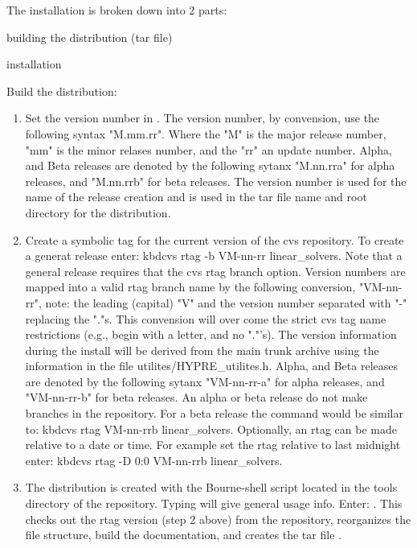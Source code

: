The installation is broken down into 2 parts: 
  \item building the distribution (tar file)
  \item installation

Build the \hypre{} distribution:

\begin{enumerate}

   \item Set the version number in .
   The version number, by convension, use the following syntax "M.mm.rr".
   Where the "M" is the major release number, "mm" is the minor
   relases number, and the "rr" an update number. Alpha, and Beta 
   releases are denoted by the following sytanx "M.nn.rra" for 
   alpha releases, and "M.nn.rrb" for beta releases. The version 
   number is used for the name of the release creation and is used
   in the tar file name and root directory for the distribution.

   \item Create a symbolic tag for the current version
   of the cvs repository. To create a generat release enter:
   kbd{cvs rtag -b VM-nn-rr linear_solvers}. Note that a
   general release requires that the cvs rtag branch option.
   Version numbers are mapped into a valid rtag branch name by the
   following conversion, "VM-nn-rr", note: the leading (capital)
   "V" and the version number separated with "-" replacing
   the "."s. This convension will over come the strict cvs
   tag name restrictions (e.g., begin with a letter, and no "."'s).
   The version information during the install will be derived
   from the main trunk archive using the information in the
   file utilites/HYPRE_utilites.h. Alpha, and Beta releases
   are denoted by the following sytanx "VM-nn-rr-a" for alpha
   releases, and "VM-nn-rr-b" for beta releases. An alpha or
   beta release do not make branches in the repository. For a beta
   release the command would be similar to: 
   kbd{cvs rtag VM-nn-rrb linear_solvers}. Optionally, an rtag
   can be made relative to a date or time. For example set the
   rtag relative to last midnight enter:
   kbd{cvs rtag -D 0:0 VM-nn-rrb linear_solvers}.

   \item The distribution is created with the  
   Bourne-shell script located in the tools directory of the 
   \hypre{} repository.  Typing  will give 
   general usage info. Enter: . This checks 
   out the rtag version (step 2 above) from the repository,
   reorganizes the file structure, build the documentation,
   and creates the tar file .

\end{enumerate}

